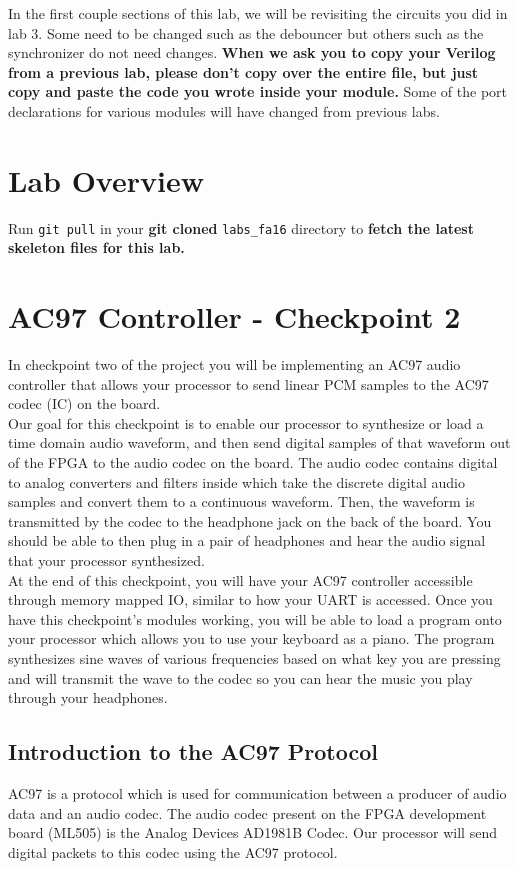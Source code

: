 \documentclass[11pt]{article}
\begin{document}
In the first couple sections of this lab, we will be revisiting the circuits you did in lab 3. Some need to be changed such as the debouncer but others such as the synchronizer do not need changes. \textbf{When we ask you to copy your Verilog from a previous lab, please don't copy over the entire file, but just copy and paste the code you wrote inside your module.} Some of the port declarations for various modules will have changed from previous labs.


\section{Lab Overview}


Run \verb|git pull| in your \textbf{git cloned} \verb|labs_fa16| directory to \textbf{fetch the latest skeleton files for this lab.}
\section{AC97 Controller - Checkpoint 2}

In checkpoint two of the project you will be implementing an AC97 audio controller that allows your processor to send linear PCM samples to the AC97 codec (IC) on the board. \\

Our goal for this checkpoint is to enable our processor to synthesize or load a time domain audio waveform, and then send digital samples of that waveform out of the FPGA to the audio codec on the board. The audio codec contains digital to analog converters and filters inside which take the discrete digital audio samples and convert them to a continuous waveform. Then, the waveform is transmitted by the codec to the headphone jack on the back of the board. You should be able to then plug in a pair of headphones and hear the audio signal that your processor synthesized. \\

At the end of this checkpoint, you will have your AC97 controller accessible through memory mapped IO, similar to how your UART is accessed. Once you have this checkpoint's modules working, you will be able to load a program onto your processor which allows you to use your keyboard as a piano. The program synthesizes sine waves of various frequencies based on what key you are pressing and will transmit the wave to the codec so you can hear the music you play through your headphones.

\subsection{Introduction to the AC97 Protocol}
AC97 is a protocol which is used for communication between a producer of audio data and an audio codec. The audio codec present on the FPGA development board (ML505) is the Analog Devices AD1981B Codec. Our processor will send digital packets to this codec using the AC97 protocol. \\
\end{document}
